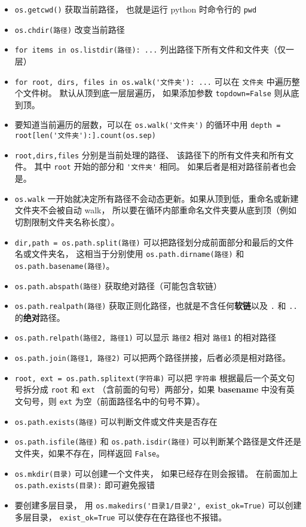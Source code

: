 
\begin{issues}
\issueDraft
\end{issues}

\begin{itemize}
\item \verb`os.getcwd()` 获取当前路径， 也就是运行 python 时命令行的 \verb`pwd`
\item \verb`os.chdir(路径)` 改变当前路径 
\item \verb`for items in os.listdir(路径): ...` 列出路径下所有文件和文件夹（仅一层）
\item \verb`for root, dirs, files in os.walk('文件夹'): ...` 可以在 \verb`文件夹` 中遍历整个文件树。 默认从顶到底一层层遍历， 如果添加参数 \verb`topdown=False` 则从底到顶。
\item 要知道当前遍历的层数，可以在 \verb`os.walk('文件夹')` 的循环中用 \verb`depth = root[len('文件夹'):].count(os.sep)`
\item \verb`root,dirs,files` 分别是当前处理的路径、 该路径下的所有文件夹和所有文件。 其中 \verb`root` 开始的部分和 \verb`'文件夹'` 相同。 如果后者是相对路径前者也会是。
\item \verb`os.walk` 一开始就决定所有路径不会动态更新。如果从顶到低，重命名或新建文件夹不会被自动 walk， 所以要在循环内部重命名文件夹要从底到顶（例如切割限制文件夹名称长度）。
\item \verb`dir,path = os.path.split(路径)` 可以把路径划分成前面部分和最后的文件名或文件夹名， 这相当于分别使用 \verb`os.path.dirname(路径)` 和 \verb`os.path.basename(路径)`。
\item \verb`os.path.abspath(路径)` 获取绝对路径（可能包含软链）
\item \verb`os.path.realpath(路径)` 获取正则化路径，也就是不含任何\textbf{软链}以及 \verb`.` 和 \verb`..` 的\textbf{绝对}路径。
\item \verb`os.path.relpath(路径2, 路径1)` 可以显示 \verb`路径2` 相对 \verb`路径1` 的相对路径
\item \verb`os.path.join(路径1, 路径2)` 可以把两个路径拼接，后者必须是相对路径。
\item \verb`root, ext = os.path.splitext(字符串)` 可以把 \verb`字符串` 根据最后一个英文句号拆分成 \verb`root` 和 \verb`ext` （含前面的句号）两部分，如果 \textbf{basename} 中没有英文句号，则 \verb`ext` 为空（前面路径名中的句号不算）。
\item \verb`os.path.exists(路径)` 可以判断文件或文件夹是否存在
\item \verb`os.path.isfile(路径)` 和 \verb`os.path.isdir(路径)` 可以判断某个路径是文件还是文件夹，如果不存在，同样返回 \verb`False`。
\item \verb`os.mkdir(目录)` 可以创建一个文件夹， 如果已经存在则会报错。 在前面加上 \verb`os.path.exists(目录):` 即可避免报错
\item 要创建多层目录， 用 \verb`os.makedirs('目录1/目录2', exist_ok=True)` 可以创建多层目录， \verb`exist_ok=True` 可以使存在在路径也不报错。
\end{itemize}
